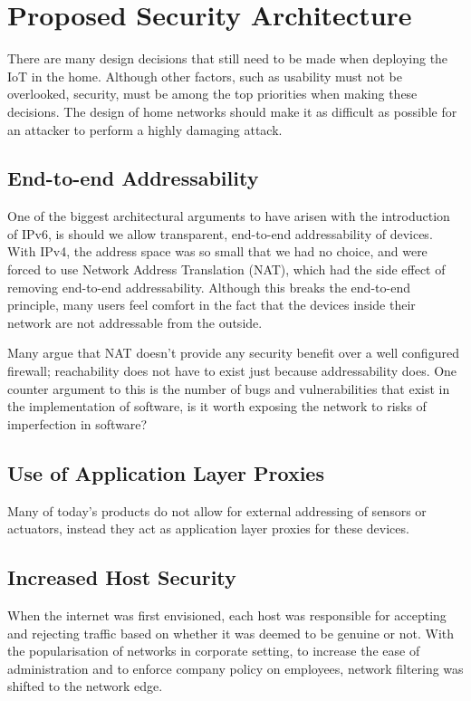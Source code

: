 \documentclass[10pt,journal,compsoc]{IEEEtran}
\begin{document}
\section{Proposed Security Architecture}
There are many design decisions that still need to be made when deploying the
IoT in the home. Although other factors, such as usability must not be
overlooked, security, must be among the top priorities when making these
decisions.  The design of home networks should make it as difficult as possible
for an attacker to perform a highly damaging attack. 

\subsection{End-to-end Addressability}
One of the biggest architectural arguments to have arisen with the introduction
of IPv6, is should we allow transparent, end-to-end addressability of devices.
With IPv4, the address space was so small that we had no choice, and were
forced to use Network Address Translation (NAT), which had the side effect of
removing end-to-end addressability. Although this breaks the end-to-end
principle, many users feel comfort in the fact that the devices inside their
network are not addressable from the outside.  

Many argue that NAT doesn't provide any security benefit over a well configured
firewall; reachability does not have to exist just because addressability does.
One counter argument to this is the number of bugs and vulnerabilities that
exist in the implementation of software, is it worth exposing the network to
risks of imperfection in software?

\subsection{Use of Application Layer Proxies}
Many of today's products do not allow for external addressing of sensors or
actuators, instead they act as application layer proxies for these devices.  

\subsection{Increased Host Security}
When the internet was first envisioned, each host was responsible for accepting
and rejecting traffic based on whether it was deemed to be genuine or not. With
the popularisation of networks in corporate setting, to increase the ease of
administration and to enforce company policy on employees, network filtering
was shifted to the network edge.
\end{document}
